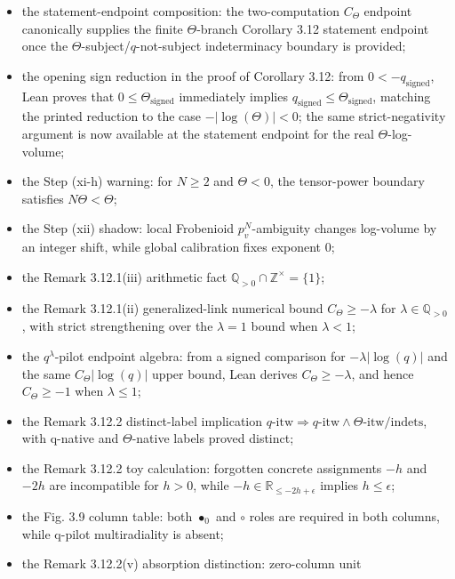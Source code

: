 \documentclass[11pt]{article}
\newcommand{\R}{\mathbb{R}}
\begin{document}
\begin{itemize}
  \(-|\log(q)|\le C_\Theta|\log(q)|\) and hence \(C_\Theta\ge-1\);
  consequently the same hypotheses reject any \(C_\Theta<-1\);
\item the statement-endpoint composition:
  the two-computation \(C_\Theta\) endpoint canonically supplies the finite
  \(\Theta\)-branch Corollary 3.12 statement endpoint once the
  \(\Theta\)-subject/\(q\)-not-subject indeterminacy boundary is provided;
\item the opening sign reduction in the proof of Corollary 3.12:
  from \(0<-q_{\mathrm{signed}}\), Lean proves that
  \(0\le\Theta_{\mathrm{signed}}\) immediately implies
  \(q_{\mathrm{signed}}\le\Theta_{\mathrm{signed}}\), matching the printed
  reduction to the case \(-|\log(\Theta)|<0\); the same strict-negativity
  argument is now available at the statement endpoint for the real
  \(\Theta\)-log-volume;
\item the Step (xi-h) warning: for \(N\ge2\) and \(\Theta<0\), the tensor-power
  boundary satisfies \(N\Theta<\Theta\);
\item the Step (xii) shadow: local Frobenioid \(p_v^N\)-ambiguity changes
  log-volume by an integer shift, while global calibration fixes exponent \(0\);
\item the Remark 3.12.1(iii) arithmetic fact
  \(\mathbb{Q}_{>0}\cap\mathbb{Z}^{\times}=\{1\}\);
\item the Remark 3.12.1(ii) generalized-link numerical bound
  \(C_\Theta\ge-\lambda\) for \(\lambda\in\mathbb{Q}_{>0}\), with strict
  strengthening over the \(\lambda=1\) bound when \(\lambda<1\);
\item the \(q^\lambda\)-pilot endpoint algebra:
  from a signed comparison for \(-\lambda|\log(q)|\) and the same
  \(C_\Theta|\log(q)|\) upper bound, Lean derives \(C_\Theta\ge-\lambda\), and
  hence \(C_\Theta\ge-1\) when \(\lambda\le1\);
\item the Remark 3.12.2 distinct-label implication
  \(q\text{-itw}\Rightarrow q\text{-itw}\wedge\Theta\text{-itw}/\mathrm{indets}\),
  with q-native and \(\Theta\)-native labels proved distinct;
\item the Remark 3.12.2 toy calculation: forgotten concrete assignments
  \(-h\) and \(-2h\) are incompatible for \(h>0\), while
  \(-h\in\R_{\le-2h+\epsilon}\) implies \(h\le\epsilon\);
\item the Fig. 3.9 column table: both \(\bullet_0\) and \(\circ\) roles are
  required in both columns, while q-pilot multiradiality is absent;
\item the Remark 3.12.2(v) absorption distinction: zero-column unit

\end{itemize}
\end{document}
